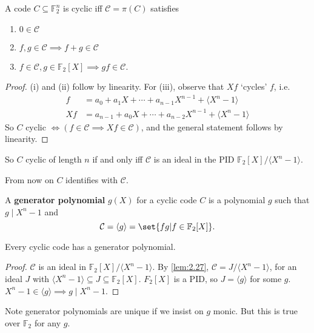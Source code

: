 \documentclass{article}
\newcommand{\F}{\mathbb{F}}
\newcommand{\1}[1]{\mathbbm{1}_{#1}}
\begin{document}
\begin{nlemma}\label{lem:2.29}
    A code $C \subseteq \F_2^n$ is cyclic iff $\mathcal{C} = \pi(C)$ satisfies
    \begin{enumerate}[label=(\roman*)]
        \item $0 \in \mathcal{C}$
        \item $f, g \in \mathcal{C} \implies f+g \in \mathcal{C}$
        \item $f \in \mathcal{C}, g \in \F_2[X] \implies g f \in \mathcal{C}$.
    \end{enumerate}
\end{nlemma}
\begin{proof}
    (i) and (ii) follow by linearity.
    For (iii), observe that $Xf$ `cycles' $f$, i.e.\
    \begin{align*}
        f &= a_0 + a_1 X + \dotsb + a_{n-1} X^{n-1} + \langle X^n - 1 \rangle\\
        Xf &= a_{n-1} + a_0 X + \dotsb + a_{n-2} X^{n-1} + \langle X^n - 1 \rangle
    \end{align*}
    So $C$ cyclic $\iff (f \in \mathcal{C} \implies Xf \in \mathcal{C})$, and the general statement follows by linearity.
\end{proof}
\begin{remark}
    So $C$ cyclic of length $n$ if and only iff $\mathcal{C}$ is an ideal in the PID $\F_2[X]/\langle X^n - 1 \rangle$.
\end{remark}
From now on $C$ identifies with $\mathcal{C}$.

\begin{defi}
    A \textbf{generator polynomial} $g(X)$ for a cyclic code $C$ is a polynomial $g$ such that $g \mid X^n - 1$ and
    \begin{equation*}
        \mathcal{C} = \langle g \rangle = \set{f g | f \in \F_2[X]}.
    \end{equation*}
\end{defi}
\begin{nthm}\label{thm:2.30}
    Every cyclic code has a generator polynomial.
\end{nthm}
\begin{proof}
    $\mathcal{C}$ is an ideal in $\F_2[X] / \langle X^n - 1 \rangle$.
    By \cref{lem:2.27}, $\mathcal{C} = J/\langle X^n - 1 \rangle$, for an ideal $J$ with $\langle X^n - 1 \rangle \subseteq J \subseteq \F_2[X]$.
    $F_2[X]$ is a PID, so $J = \langle g \rangle$ for some $g$. $X^n - 1 \in \langle g \rangle \implies g \mid X^n - 1$.
\end{proof}
Note generator polynomials are unique if we insist on $g$ monic.
But this is true over $\F_2$ for any $g$.
\end{document}
